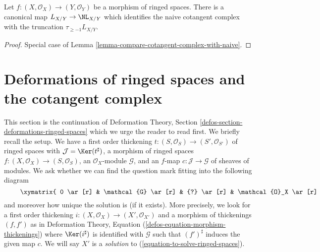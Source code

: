 \begin{lemma}
\label{lemma-compare-cotangent-complex-with-naive-ringed-spaces}
Let $f : (X, \mathcal{O}_X) \to (Y, \mathcal{O}_Y)$ be a morphism of
ringed spaces. There is a canonical map $L_{X/Y} \to \NL_{X/Y}$ which
identifies the naive cotangent complex with the truncation
$\tau_{\geq -1}L_{X/Y}$.
\end{lemma}

\begin{proof}
Special case of Lemma \ref{lemma-compare-cotangent-complex-with-naive}.
\end{proof}






\section{Deformations of ringed spaces and the cotangent complex}
\label{section-deformations-ringed-spaces}

\noindent
This section is the continuation of
Deformation Theory, Section \ref{defos-section-deformations-ringed-spaces}
which we urge the reader to read first. We briefly recall the setup.
We have a first order thickening
$t : (S, \mathcal{O}_S) \to (S', \mathcal{O}_{S'})$ of ringed spaces
with $\mathcal{J} = \Ker(t^\sharp)$, a morphism of ringed spaces
$f : (X, \mathcal{O}_X) \to (S, \mathcal{O}_S)$, an $\mathcal{O}_X$-module
$\mathcal{G}$, and an $f$-map $c : \mathcal{J} \to \mathcal{G}$
of sheaves of modules. We ask whether we can find
the question mark fitting into the following diagram
\begin{equation}
\label{equation-to-solve-ringed-spaces}
\vcenter{
\xymatrix{
0 \ar[r] & \mathcal{G} \ar[r] & {?} \ar[r] & \mathcal{O}_X \ar[r] & 0 \\
0 \ar[r] & \mathcal{J} \ar[u]^c \ar[r] & \mathcal{O}_{S'} \ar[u] \ar[r] &
\mathcal{O}_S \ar[u] \ar[r] & 0
}
}
\end{equation}
and moreover how unique the solution is (if it exists). More precisely,
we look for a first order thickening
$i : (X, \mathcal{O}_X) \to (X', \mathcal{O}_{X'})$
and a morphism of thickenings $(f, f')$ as in
Deformation Theory, Equation (\ref{defos-equation-morphism-thickenings})
where $\Ker(i^\sharp)$ is identified with $\mathcal{G}$
such that $(f')^\sharp$ induces the given map $c$.
We will say $X'$ is a {\it solution} to
(\ref{equation-to-solve-ringed-spaces}).

